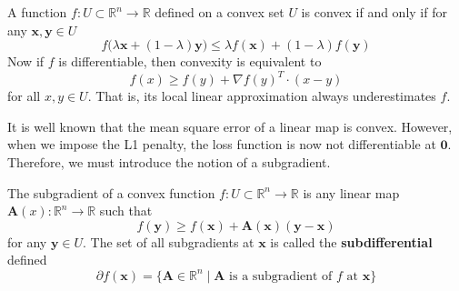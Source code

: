     \begin{definition}
      A function $f: U \subset \mathbb{R}^n \rightarrow \mathbb{R}$ defined on a convex set $U$ is convex if and only if for any $\mathbf{x}, \mathbf{y} \in U$
      \begin{equation}
        f \big(\lambda \mathbf{x} + (1 - \lambda) \mathbf{y} \big) \leq \lambda f(\mathbf{x}) + (1 - \lambda) f(\mathbf{y})
      \end{equation}
      Now if $f$ is differentiable, then convexity is equivalent to 
      \begin{equation}
        f(x) \geq f(y) + \nabla f(y)^T \cdot (x - y)
      \end{equation}
      for all $x, y \in U$. That is, its local linear approximation always underestimates $f$. 
    \end{definition}

    It is well known that the mean square error of a linear map is convex. However, when we impose the L1 penalty, the loss function is now not differentiable at $\mathbf{0}$. Therefore, we must introduce the notion of a subgradient. 

    \begin{definition}[Subgradient]
      The subgradient of a convex function $f: U \subset \mathbb{R}^n \rightarrow \mathbb{R}$ is any linear map $\mathbf{A} (x): \mathbb{R}^n \rightarrow \mathbb{R}$ such that 
      \begin{equation}
        f(\mathbf{y}) \geq f(\mathbf{x}) + \mathbf{A}(\mathbf{x}) (\mathbf{y} - \mathbf{x})
      \end{equation}
      for any $\mathbf{y} \in U$. The set of all subgradients at $\mathbf{x}$ is called the \textbf{subdifferential} defined 
      \begin{equation}
        \partial f (\mathbf{x}) = \{ \mathbf{A} \in \mathbb{R}^n \mid \mathbf{A} \text{ is a subgradient of } f \text{ at } \mathbf{x} \}
      \end{equation}
    \end{definition}

